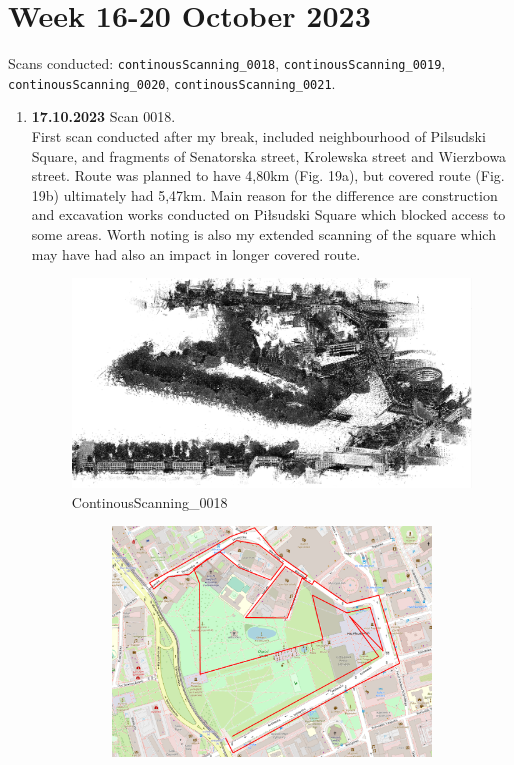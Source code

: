\documentclass[a4paper,12pt]{book}
\begin{document}
\section{Week 16-20 October 2023}
Scans conducted: \verb|continousScanning_0018|, \verb|continousScanning_0019|, \verb|continousScanning_0020|, \verb|continousScanning_0021|.\\
\begin{enumerate}
	\item \textbf{17.10.2023} Scan 0018. \\
	First scan conducted after my break, included neighbourhood of Pilsudski Square, and fragments of Senatorska street, Krolewska street and Wierzbowa street. Route was planned to have 4,80km (Fig. 19a), but covered route (Fig. 19b) ultimately had 5,47km. Main reason for the difference are construction and excavation works conducted on Piłsudski Square which blocked access to some areas. Worth noting is also my extended scanning of the square which may have had also an impact in longer covered route.
	\begin{figure}[H]
		\includegraphics[width=1\linewidth]{cloud18}
		\caption{ContinousScanning\_0018}
	\end{figure}
	\begin{figure}[H]
		\centering
		\begin{subfigure}{.95\textwidth}
			\centering
			\includegraphics[width=1\linewidth]{route_p18}

\end{subfigure}
\end{figure}
\end{enumerate}
\end{document}
